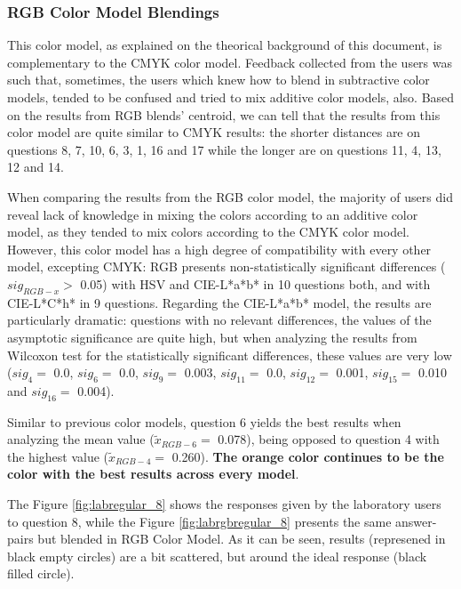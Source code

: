 \subsubsection{RGB Color Model Blendings}
\label{subsubsec:rgbcolormodel}
%
This color model, as explained on the theorical background of this document, is complementary to the CMYK color model. Feedback collected from the users was such that, sometimes, the users which knew how to blend in subtractive color models, tended to be confused and tried to mix additive color models, also.
Based on the results from RGB blends' centroid, we can tell that the results from this color model are quite similar to CMYK results: the shorter distances are on questions 8, 7, 10, 6, 3, 1, 16 and 17 while the longer are on questions 11, 4, 13, 12 and 14. \par
%
When comparing the results from the RGB color model, the majority of users did reveal lack of knowledge in mixing the colors according to an additive color model, as they tended to mix colors according to the CMYK color model. However, this color model has a high degree of compatibility with every other model,
excepting CMYK: RGB presents non-statistically significant differences ($sig_{RGB-x} > $ 0.05) with HSV and CIE-L*a*b* in 10 questions both, and with CIE-L*C*h* in 9 questions. Regarding the CIE-L*a*b* model, the results are particularly dramatic: questions with no relevant differences, the values of the
asymptotic significance are quite high, but when analyzing the results from Wilcoxon test for the statistically significant differences, these values are very low ($sig_{4} = $ 0.0, $sig_{6} = $ 0.0, $sig_{9} = $ 0.003, $sig_{11} = $ 0.0, $sig_{12} = $ 0.001, $sig_{15} = $ 0.010 and $sig_{16} = $ 0.004). \par
%
Similar to previous color models, question 6 yields the best results when analyzing the mean value ($\tilde{x}_{RGB-6} = $ 0.078), being opposed to question 4 with the highest value ($\tilde{x}_{RGB-4} = $ 0.260). \textbf{The orange color continues to be the color with the best results across every model}. \par
%
The Figure \ref{fig:labregular_8} shows the responses given by the laboratory users to question 8, while the Figure \ref{fig:labrgbregular_8} presents the same answer-pairs but blended in RGB Color Model. As it can be seen, results (represened in black empty circles) are a bit scattered, but around the ideal response
(black filled circle). \par
%

